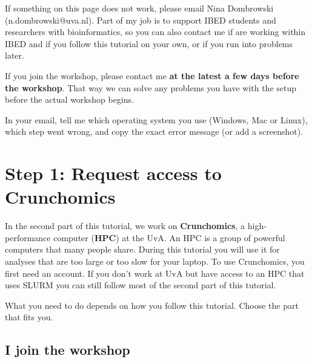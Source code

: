 \documentclass[
  letterpaper,
  DIV=11,
  numbers=noendperiod]{scrreprt}
\begin{document}
\begin{tcolorbox}[enhanced jigsaw, opacityback=0, colframe=quarto-callout-important-color-frame, bottomtitle=1mm, breakable, leftrule=.75mm, toptitle=1mm, rightrule=.15mm, colbacktitle=quarto-callout-important-color!10!white, titlerule=0mm, coltitle=black, title=\textcolor{quarto-callout-important-color}{\faExclamation}\hspace{0.5em}{Getting help}, bottomrule=.15mm, arc=.35mm, toprule=.15mm, left=2mm, opacitybacktitle=0.6, colback=white]

If something on this page does not work, please email Nina Dombrowski
(n.dombrowski@uva.nl). Part of my job is to support IBED students and
researchers with bioinformatics, so you can also contact me if are
working within IBED and if you follow this tutorial on your own, or if
you run into problems later.

If you join the workshop, please contact me \textbf{at the latest a few
days before the workshop}. That way we can solve any problems you have
with the setup before the actual workshop begins.

In your email, tell me which operating system you use (Windows, Mac or
Linux), which step went wrong, and copy the exact error message (or add
a screenshot).

\end{tcolorbox}

\section{Step 1: Request access to
Crunchomics}\label{step-1-request-access-to-crunchomics}

In the second part of this tutorial, we work on \textbf{Crunchomics}, a
high-performance computer (\textbf{HPC}) at the UvA. An HPC is a group
of powerful computers that many people share. During this tutorial you
will use it for analyses that are too large or too slow for your laptop.
To use Crunchomics, you first need an account. If you don't work at UvA
but have access to an HPC that uses SLURM you can still follow most of
the second part of this tutorial.

What you need to do depends on how you follow this tutorial. Choose the
part that fits you.

\subsection{I join the workshop}
\end{document}
